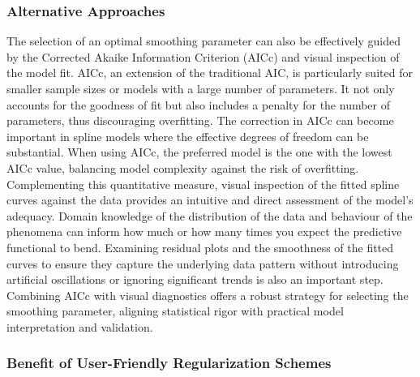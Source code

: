 \documentclass[12pt, twoside,hidelinks]{article}
\theoremstyle{definition}
\numberwithin{equation}{section}
\begin{document}
\subsubsection{Alternative Approaches}

The selection of an optimal smoothing parameter can also be effectively guided by the Corrected Akaike Information Criterion (AICc) and visual inspection of the model fit. AICc, an extension of the traditional AIC, is particularly suited for smaller sample sizes or models with a large number of parameters. It not only accounts for the goodness of fit but also includes a penalty for the number of parameters, thus discouraging overfitting. The correction in AICc can become important in spline models where the effective degrees of freedom can be substantial. When using AICc, the preferred model is the one with the lowest AICc value, balancing model complexity against the risk of overfitting. Complementing this quantitative measure, visual inspection of the fitted spline curves against the data provides an intuitive and direct assessment of the model’s adequacy. Domain knowledge of the distribution of the data and behaviour of the phenomena can inform how much or how many times you expect the predictive functional to bend. Examining residual plots and the smoothness of the fitted curves to ensure they capture the underlying data pattern without introducing artificial oscillations or ignoring significant trends is also an important step. Combining AICc with visual diagnostics offers a robust strategy for selecting the smoothing parameter, aligning statistical rigor with practical model interpretation and validation. 
\newline

\subsubsection{Benefit of User-Friendly Regularization Schemes} 
\end{document}
